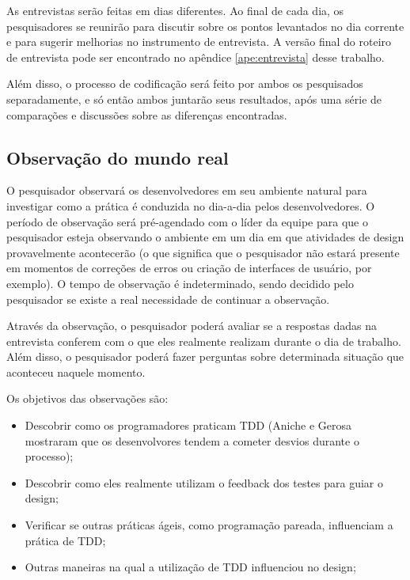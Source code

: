 As entrevistas serão feitas em dias diferentes. Ao final de cada dia, os pesquisadores se reunirão para discutir
sobre os pontos levantados no dia corrente e para sugerir melhorias no instrumento de entrevista. 
A versão final do roteiro de entrevista pode ser encontrado no apêndice \ref{ape:entrevista} desse trabalho.

Além disso, o processo de codificação \cite{seaman} será feito por ambos os pesquisados separadamente, e só então
ambos juntarão seus resultados, após uma série de comparações e discussões sobre as diferenças encontradas.

\subsection{Observação do mundo real}
\label{sec:planejamento-estrategia-observacao}

O pesquisador observará os desenvolvedores em seu ambiente natural para investigar como a 
prática é conduzida no dia-a-dia pelos desenvolvedores. O período de observação será pré-agendado com o
líder da equipe para que o pesquisador esteja observando o ambiente em um dia em que atividades de design provavelmente
acontecerão (o que significa que o pesquisador não estará presente em momentos de correções de erros ou criação de interfaces de usuário, por exemplo).
O tempo de observação é indeterminado, sendo decidido pelo pesquisador se existe a real necessidade de continuar a observação.

Através da observação, o pesquisador poderá avaliar se
a respostas dadas na entrevista conferem com o que eles realmente realizam durante o dia de trabalho. Além disso, o pesquisador
poderá fazer perguntas sobre determinada situação que aconteceu naquele momento.

Os objetivos das observações são:

\begin{itemize}
	\item Descobrir como os programadores praticam TDD (Aniche e Gerosa \cite{aniche-mistakes} mostraram que os desenvolvores tendem a cometer desvios durante o processo);
	\item Descobrir como eles realmente utilizam o feedback dos testes para guiar o design;
	\item Verificar se outras práticas ágeis, como programação pareada, influenciam a prática de TDD;
	\item Outras maneiras na qual a utilização de TDD influenciou no design;
\end{itemize}

